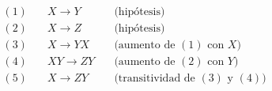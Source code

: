 \documentclass[preview]{standalone}
\begin{document}
\begin{align*}
(1) & \quad  X\rightarrow Y  &\quad  \text{(hip\'otesis)}\\
(2) & \quad  X\rightarrow Z  &\quad  \text{(hip\'otesis)}\\
(3) & \quad  X\rightarrow YX  &\quad  \text{(aumento de $(1)$ con $X$)}\\
(4) & \quad  XY\rightarrow ZY  &\quad  \text{(aumento de $(2)$ con $Y$)}\\
(5) & \quad  X\rightarrow ZY  &\quad  \text{(transitividad de $(3)$ y $(4)$)}\\
\end{align*}
\end{document}
